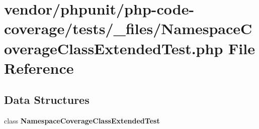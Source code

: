 \section{vendor/phpunit/php-\/code-\/coverage/tests/\+\_\+files/\+Namespace\+Coverage\+Class\+Extended\+Test.php File Reference}
\label{php-code-coverage_2tests_2__files_2_namespace_coverage_class_extended_test_8php}
\subsection*{Data Structures}
\begin{DoxyCompactItemize}
\item 
class {\bf Namespace\+Coverage\+Class\+Extended\+Test}
\end{DoxyCompactItemize}
